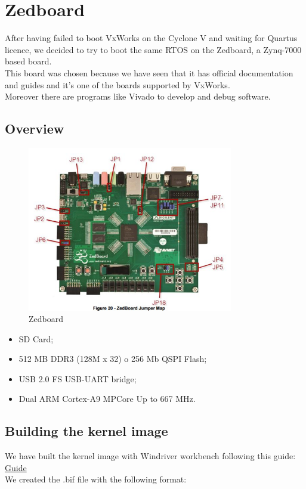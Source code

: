 \chapter{Zedboard}
\label{ch:zedboard}

After having failed to boot VxWorks on the Cyclone V and waiting for Quartus licence, we decided to try to boot the same RTOS on the Zedboard, a Zynq-7000 based board.\\
This board was chosen because we have seen that it has official documentation 
and guides and it’s one of the boards supported by VxWorks. \\
Moreover there are programs like Vivado to develop and debug software.

\section{Overview}
\begin{figure}[h]
	\centering		\includegraphics[width=0.8\textwidth]{img/zedboard}
	\caption{Zedboard}
    	\label{fig:zedboard}
\end{figure}

\begin{itemize}
\item SD Card;
\item 512 MB DDR3 (128M x 32) o 256 Mb QSPI Flash;
\item USB 2.0 FS USB-UART bridge;
\item Dual ARM Cortex-A9 MPCore Up to 667 MHz.
\end{itemize}


\section{Building the kernel image}
We have built the kernel image with Windriver workbench following this guide:\\
\href{https://www.xilinx.com/support/documentation/application_notes/xapp1158-zynq-7000-vxworks-bsp.pdf}{Guide}\\
We created the .bif file with the following format:

